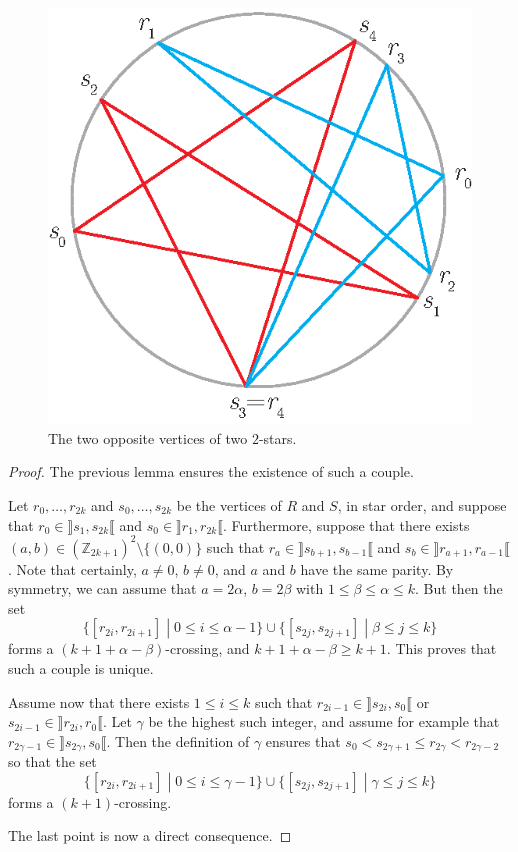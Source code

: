 \documentclass[12pt]{amsart}
\begin{document}
\begin{figure}
\centerline{\includegraphics[scale=1]{oppvert.eps}}
\caption{\small{The two opposite vertices of two $2$-stars.}}\label{oppvert}
\end{figure}


\begin{proof}
The previous lemma ensures the existence of such a couple.

Let $r_0,\ldots,r_{2k}$ and $s_0,\ldots,s_{2k}$ be the vertices of $R$ and $S$, in star order, and suppose that $r_0\in\rrbracket s_1,s_{2k}\llbracket$ and $s_0\in\rrbracket r_1,r_{2k}\llbracket$. Furthermore, suppose that there exists $(a,b)\in(\mathbb{Z}_{2k+1})^2\setminus\{(0,0)\}$ such that $r_a\in\rrbracket s_{b+1},s_{b-1}\llbracket$ and $s_b\in\rrbracket r_{a+1},r_{a-1}\llbracket$. Note that certainly, $a\ne0$, $b\ne0$, and $a$ and $b$ have the same parity. By symmetry, we can assume that $a=2\alpha$, $b=2\beta$ with $1\le\beta\le\alpha\le k$. But then the set
$$\{[r_{2i},r_{2i+1}]\;|\; 0\le i\le \alpha-1\}\cup\{[s_{2j},s_{2j+1}]\;|\; \beta\le j\le k\}$$
forms a $(k+1+\alpha-\beta)$-crossing, and $k+1+\alpha-\beta\ge k+1$. This proves that such a couple is unique.

Assume now that there exists $1\le i\le k$ such that $r_{2i-1}\in\rrbracket s_{2i},s_0\llbracket$ or $s_{2i-1}\in\rrbracket r_{2i},r_0\llbracket$. Let $\gamma$ be the highest such integer, and assume for example that $r_{2\gamma-1}\in\rrbracket s_{2\gamma},s_0\llbracket$. Then the definition of $\gamma$ ensures that
$s_0<s_{2\gamma+1}\le r_{2\gamma}<r_{2\gamma-2}$
so that the set
$$\{[r_{2i},r_{2i+1}]\;|\; 0\le i\le\gamma-1\}\cup\{[s_{2j},s_{2j+1}]\;|\; \gamma\le j\le k\}$$
forms a $(k+1)$-crossing.

The last point is now a direct consequence.
\end{proof}
\end{document}
